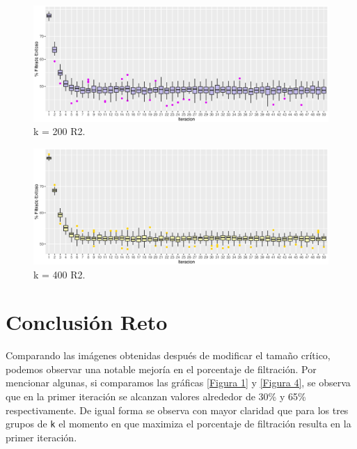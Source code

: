 \documentclass{article}
\begin{document}
\begin{figure}[ht] %
    \centering
    \includegraphics[width=150mm]{k200r2.eps} %
    \caption{k = 200 R2.}
    \label{Figura 5}
\end{figure}

\begin{figure}[ht] %
    \centering
    \includegraphics[width=150mm]{k400r2.eps} %
    \caption{k = 400 R2.}
    \label{Figura 6}
\end{figure}
\newpage

\section{Conclusi\'on Reto}
Comparando las im\'agenes obtenidas despu\'es de modificar el tamaño cr\'itico, podemos observar una notable mejor\'ia en el porcentaje de filtraci\'on.
Por mencionar algunas, si comparamos las gr\'aficas \ref{Figura 1} y \ref{Figura 4}, se observa que en la primer iteraci\'on se alcanzan valores alrededor de 30\% y 65\% respectivamente\cite{symbolporcent}. 
De igual forma se observa con mayor claridad que para los tres grupos de \texttt{k} el momento en que maximiza el porcentaje de filtraci\'on resulta en la primer iteraci\'on.



\end{document}
